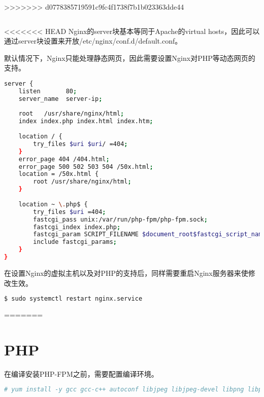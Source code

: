 >>>>>>> d0778385719591c9fc4f1738f7b1b023363dde44
\begin{lstlisting}[language=bash]

\end{lstlisting}

<<<<<<< HEAD
Nginx的server块基本等同于Apache的virtual hosts，因此可以通过server块设置来开放/etc/nginx/conf.d/default.conf。

默认情况下，Nginx只能处理静态网页，因此需要设置Nginx对PHP等动态网页的支持。


\begin{lstlisting}[language=bash]
server {
    listen       80;
    server_name  server-ip;
 
    root   /usr/share/nginx/html;
    index index.php index.html index.htm;
 
    location / {
        try_files $uri $uri/ =404;
    }
    error_page 404 /404.html;
    error_page 500 502 503 504 /50x.html;
    location = /50x.html {
        root /usr/share/nginx/html;
    }
 
    location ~ \.php$ {
        try_files $uri =404;
        fastcgi_pass unix:/var/run/php-fpm/php-fpm.sock;
        fastcgi_index index.php;
        fastcgi_param SCRIPT_FILENAME $document_root$fastcgi_script_name;
        include fastcgi_params;
    }
}
\end{lstlisting}

在设置Nginx的虚拟主机以及对PHP的支持后，同样需要重启Nginx服务器来使修改生效。

\begin{lstlisting}[language=bash]
$ sudo systemctl restart nginx.service
\end{lstlisting}


=======

\section{PHP}


在编译安装PHP-FPM之前，需要配置编译环境。

\begin{lstlisting}[language=bash]
# yum install -y gcc gcc-c++ autoconf libjpeg libjpeg-devel libpng libpng-devel freetype freetype-devel libxml2 libxml2-devel zlib zlib-devel glibc glibc-devel glib2 glib2-devel bzip2 bzip2-devel ncurses ncurses-devel curl curl-devel e2fsprogs e2fsprogs-devel krb5 krb5-devel libidn libidn-devel openssl openssl-devel openldap openldap-devel nss_ldap openldap-clients openldap-servers
\end{lstlisting}

